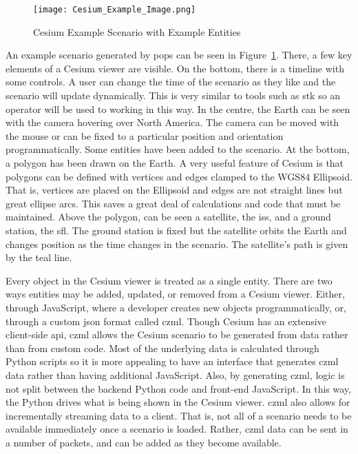 \begin{figure}
    \centering
    \texttt{[image: Cesium\_Example\_Image.png]} 
    \caption{Cesium Example Scenario with Example Entities} 
    \label{fig:example_cesium} 
\end{figure}

An example scenario generated by \gls{pops} can be seen in
Figure~\ref{fig:example_cesium}. There, a few key elements of a Cesium viewer
are visible. On the bottom, there is a timeline with some controls. A user can
change the time of the scenario as they like and the scenario will update
dynamically. This is very similar to tools such as \gls{stk} so an operator
will be used to working in this way. In the centre, the Earth can be seen with
the camera hovering over North America.  The camera can be moved with the mouse
or can be fixed to a particular position and orientation programmatically.
Some entities have been added to the scenario. At the bottom, a polygon has
been drawn on the Earth. A very useful feature of Cesium is that polygons can
be defined with vertices and edges clamped to the WGS84 Ellipsoid. That is,
vertices are placed on the Ellipsoid and edges are not straight lines but great
ellipse arcs. This saves a great deal of calculations and code that must be
maintained. Above the polygon, can be seen a satellite, the \gls{iss}, and a
ground station, the \gls{sfl}. The ground station is fixed but the satellite
orbits the Earth and changes position as the time changes in the scenario. The
satellite's path is given by the teal line. 

Every object in the Cesium viewer is treated as a single entity. There are two
ways entities may be added, updated, or removed from a Cesium viewer. Either,
through JavaScript, where a developer creates new objects programmatically, or,
through a custom \gls{json} format called \gls{czml}. Though Cesium has an
extensive client-side \gls{api}, \gls{czml} allows the Cesium scenario to be
generated from data rather than from custom code. Most of the underlying data
is calculated through Python scripts so it is more appealing to have an
interface that generates \gls{czml} data rather than having additional
JavaScript. Also, by generating \gls{czml}, logic is not split between the
backend Python code and front-end JavaScript. In this way, the Python drives
what is being shown in the Cesium viewer. \gls{czml} also allows for
incrementally streaming data to a client. That is, not all of a scenario needs
to be available immediately once a scenario is loaded. Rather, \gls{czml} data
can be sent in a number of packets, and can be added as they become available.

